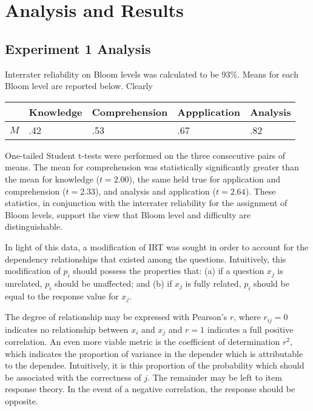 \section{Analysis and Results}

\subsection{Experiment 1 Analysis}

Interrater reliability on Bloom levels
was calculated to be 93\%.  Means for each Bloom level are reported below.
Clearly

\begin{center}
\begin{tabular}{|l|l|l|l|l|}
                                                                 \hline
      &   Knowledge & Comprehension & Appplication & Analysis \\ \hline
 $M$  &  .42 & .53 & .67 & .82  \\ \hline
\end{tabular}
\end{center}

One-tailed Student t-tests were performed on the three consecutive pairs of
means.  The mean for comprehension was statistically significantly greater than
the mean for knowledge ($t=2.00$), the same held true for application and
comprehension ($t=2.33$), and analysis and application ($t=2.64$).  These
statistics, in conjunction with the interrater reliability for the assignment
of Bloom levels, support the view that Bloom level and difficulty are
distinguishable.

In light of this data, a modification of IRT was sought in order to account for
the dependency relationships that existed among the questions.  Intuitively,
this modification of $p_i$ should possess the properties that: (a) if a
question $x_j$ is unrelated, $p_i$ should be unaffected; and (b) if $x_j$ is
fully related, $p_i$ should be equal to the response value for $x_j$. 

The degree of relationship may be expressed with Pearson's $r$, where
$r_{ij}=0$ indicates no relationship between $x_i$ and $x_j$ and $r=1$
indicates a full positive correlation.  An even more viable metric is the
coefficient of determination $r^2$, which indicates the proportion of variance
in the depender which is attributable to the dependee.  Intuitively, it is this
proportion of the probability which should be associated with the correctness
of $j$.  The remainder may be left to item response theory.  In the event of a
negative correlation, the response should be opposite.


